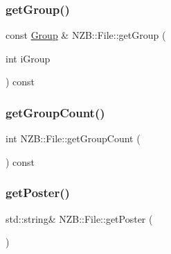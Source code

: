 \hypertarget{class_n_z_b_1_1_file_a286c4fc01910d1c1e9d70369d768b641}{}\label{class_n_z_b_1_1_file_a286c4fc01910d1c1e9d70369d768b641} 
\subsubsection{\texorpdfstring{get\+Group()}{getGroup()}\hspace{0.1cm}{\footnotesize\ttfamily [2/2]}}
{\footnotesize\ttfamily const \hyperlink{class_n_z_b_1_1_group}{Group} \& N\+Z\+B\+::\+File\+::get\+Group (\begin{DoxyParamCaption}\item[{int}]{i\+Group }\end{DoxyParamCaption}) const}

\hypertarget{class_n_z_b_1_1_file_a423866b094bc656afbb4cf6a3667c8b6}{}\label{class_n_z_b_1_1_file_a423866b094bc656afbb4cf6a3667c8b6} 
\subsubsection{\texorpdfstring{get\+Group\+Count()}{getGroupCount()}}
{\footnotesize\ttfamily int N\+Z\+B\+::\+File\+::get\+Group\+Count (\begin{DoxyParamCaption}{ }\end{DoxyParamCaption}) const\hspace{0.3cm}{\ttfamily [inline]}}

\hypertarget{class_n_z_b_1_1_file_a5203542d4807f92d520c6101a8927af9}{}\label{class_n_z_b_1_1_file_a5203542d4807f92d520c6101a8927af9} 
\subsubsection{\texorpdfstring{get\+Poster()}{getPoster()}\hspace{0.1cm}{\footnotesize\ttfamily [1/2]}}
{\footnotesize\ttfamily std\+::string\& N\+Z\+B\+::\+File\+::get\+Poster (\begin{DoxyParamCaption}{ }\end{DoxyParamCaption})\hspace{0.3cm}{\ttfamily [inline]}}

